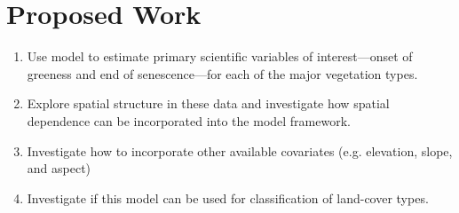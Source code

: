 \newpage 
\section{Proposed Work} 
\begin{enumerate}
	\item Use model to estimate primary scientific variables of interest---onset of greeness and end of senescence---for each of the major vegetation types. 
	\item Explore spatial structure in these data and investigate how spatial dependence can be incorporated into the model framework. 
	\item Investigate how to incorporate other available covariates (e.g. elevation, slope, and aspect) 
	\item Investigate if this model can be used for classification of land-cover types. 
\end{enumerate}
